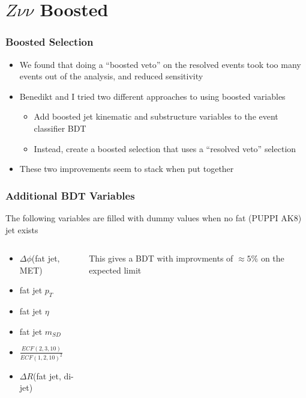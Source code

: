 \documentclass{beamer}
\begin{document}
\section{$Z\nu\nu$ Boosted}

\begin{frame}
  \frametitle{Boosted Selection}
  \begin{itemize}
  \item We found that doing a ``boosted veto'' on the resolved events took too many
    events out of the analysis, and reduced sensitivity
  \item Benedikt and I tried two different approaches to using boosted variables
    \begin{itemize}
    \item Add boosted jet kinematic and substructure variables to the event classifier BDT
    \item Instead, create a boosted selection that uses a ``resolved veto'' selection
    \end{itemize}
  \item These two improvements seem to stack when put together
  \end{itemize}
\end{frame}

\begin{frame}
  \frametitle{Additional BDT Variables}
  The following variables are filled with dummy values when no fat (PUPPI AK8) jet exists
  \begin{columns}
    \begin{column}{0.5\linewidth}
      \begin{itemize}
      \item $\Delta \phi$(fat jet, MET)
      \item fat jet $p_T$
      \item fat jet $\eta$
      \item fat jet $m_{SD}$
      \item $\frac{ECF(2, 3, 10)}{ECF(1, 2, 10)^2}$
      \item $\Delta R$(fat jet, di-jet)
      \end{itemize}
    \end{column}
    \begin{column}{0.5\linewidth}
      This gives a BDT with improvments of $\approx 5\%$ on the expected limit
    \end{column}
  \end{columns}
\end{frame}
\end{document}
